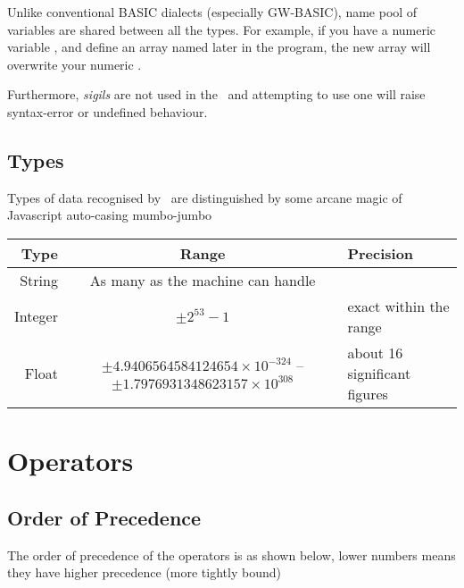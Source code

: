 Unlike conventional BASIC dialects (especially GW-BASIC), name pool of variables are shared between all the types. For example, if you have a numeric variable , and define an array named  later in the program, the new array will overwrite your numeric .

Furthermore, \emph{sigils} are not used in the \tbas\ and attempting to use one will raise syntax-error or undefined behaviour.

\subsection{Types}

Types of data recognised by \tbas\ are distinguished by some arcane magic of Javascript auto-casing mumbo-jumbo

\begin{tabulary}{\textwidth}{rCL}
Type & Range & Precision \\
\hline
String & As many as the machine can handle & \, \\
Integer & $ \pm 2^{53}-1 $ & exact within the range \\
Float & $ \pm 4.9406564584124654 \times 10^{-324} $ -- $ \pm 1.7976931348623157 \times 10^{308} $ & about 16 significant figures \\
\end{tabulary}

\section{Operators}
\subsection{Order of Precedence}

The order of precedence of the operators is as shown below, lower numbers means they have higher precedence (more tightly bound)

